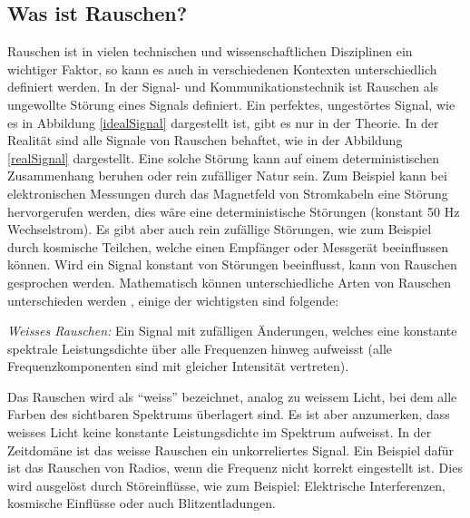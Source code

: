 


\subsection{Was ist Rauschen?\label{brown:Rauschen:Arten}}

Rauschen ist in vielen technischen und wissenschaftlichen Disziplinen ein wichtiger Faktor, so kann es auch in verschiedenen Kontexten unterschiedlich definiert werden. In der Signal- und Kommunikationstechnik ist Rauschen als ungewollte Störung eines Signals definiert. Ein perfektes, ungestörtes Signal, wie es in Abbildung \ref{idealSignal} dargestellt ist, gibt es nur in der Theorie. In der Realität sind alle Signale von Rauschen behaftet, wie in der Abbildung \ref{realSignal} dargestellt. Eine solche Störung kann auf einem deterministischen Zusammenhang beruhen oder rein zufälliger Natur sein. Zum Beispiel kann bei elektronischen Messungen durch das Magnetfeld von Stromkabeln eine Störung hervorgerufen werden, dies wäre eine deterministische Störungen (konstant 50 Hz Wechselstrom). Es gibt aber auch rein zufällige Störungen, wie zum Beispiel durch kosmische Teilchen, welche einen Empfänger oder Messgerät beeinflussen können. Wird ein Signal konstant von Störungen beeinflusst, kann von Rauschen gesprochen werden. Mathematisch können unterschiedliche Arten von Rauschen unterschieden werden \cite{werner2008signale}, einige der wichtigsten sind folgende: 


\begin{definition}
{\em Weisses Rauschen:}
Ein Signal mit zufälligen Änderungen, welches eine konstante spektrale Leistungsdichte über alle Frequenzen hinweg aufweisst (alle Frequenzkomponenten sind mit gleicher Intensität vertreten).
\end{definition}

Das Rauschen wird als ``weiss'' bezeichnet, analog zu weissem Licht, bei dem alle Farben des sichtbaren Spektrums überlagert sind. Es ist aber anzumerken, dass weisses Licht keine konstante Leistungsdichte im Spektrum aufweisst. In der Zeitdomäne ist das weisse Rauschen ein unkorreliertes Signal. Ein Beispiel dafür ist das Rauschen von Radios, wenn die Frequenz nicht korrekt eingestellt ist. Dies wird ausgelöst durch Störeinflüsse, wie zum Beispiel: Elektrische Interferenzen, kosmische Einflüsse oder auch Blitzentladungen.


